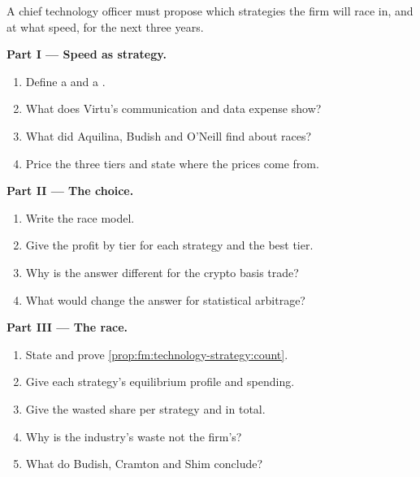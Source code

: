 \begin{problem}\label{pb:fm:technology-strategy:1}
A chief technology officer must propose which strategies the firm will race in, and at what speed, for the next three years.

\medskip\noindent\textbf{Part I --- Speed as strategy.}
\begin{enumerate}
\item Define a  and a .
\item What does Virtu's communication and data expense show?
\item What did Aquilina, Budish and O'Neill find about races?
\item Price the three tiers and state where the prices come from.
\end{enumerate}

\medskip\noindent\textbf{Part II --- The choice.}
\begin{enumerate}[resume]
\item Write the race model.
\item Give the profit by tier for each strategy and the best tier.
\item Why is the answer different for the crypto basis trade?
\item What would change the answer for statistical arbitrage?
\end{enumerate}

\medskip\noindent\textbf{Part III --- The race.}
\begin{enumerate}[resume]
\item State and prove \cref{prop:fm:technology-strategy:count}.
\item Give each strategy's equilibrium profile and spending.
\item Give the wasted share per strategy and in total.
\item Why is the industry's waste not the firm's?
\item What do Budish, Cramton and Shim conclude?
\end{enumerate}


\end{problem}
